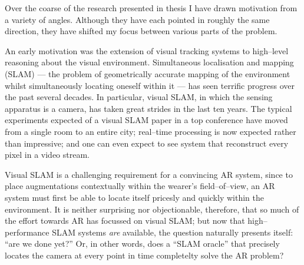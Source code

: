 %



Over the coarse of the research presented in thesis I have drawn
motivation from a variety of angles. Although they have each pointed
in roughly the same direction, they have shifted my focus between
various parts of the problem.

An early motivation was the extension of visual tracking systems to
high--level reasoning about the visual environment. Simultaneous
localisation and mapping (SLAM) --- the problem of geometrically
accurate mapping of the environment whilst simultaneously locating
oneself within it --- has seen terrific progress over the past several
decades. In particular, visual SLAM, in which the sensing apparatus is
a camera, has taken great strides in the last ten years. The typical
experiments expected of a visual SLAM paper in a top conference have
moved from a single room to an entire city; real--time processing is
now expected rather than impressive; and one can even expect to see
system that reconstruct every pixel in a video stream.

Visual SLAM is a challenging requirement for a convincing AR system,
since to place augmentations contextually within the wearer's
field--of--view, an AR system must first be able to locate itself
pricesly and quickly within the environment. It is neither surprising
nor objectionable, therefore, that so much of the effort towards AR
has focussed on visual SLAM; but now that high--performance SLAM
systems \textit{are} available, the question naturally presents
itself: ``are we done yet?'' Or, in other words, does a ``SLAM
oracle'' that precisely locates the camera at every point in time
completelty solve the AR problem?


